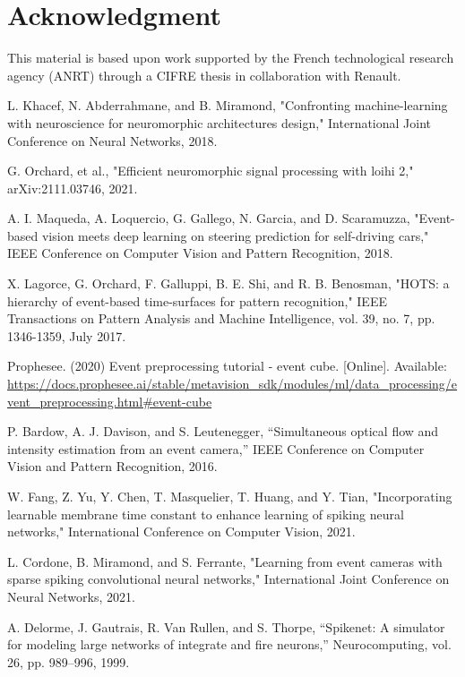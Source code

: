 \documentclass[conference]{IEEEtran}
\begin{document}
\section*{Acknowledgment}

This material is based upon work supported by the French technological research agency (ANRT) through a CIFRE thesis in collaboration with Renault.


\begin{thebibliography}{00}

 L. Khacef, N. Abderrahmane, and B. Miramond, "Confronting machine-learning with neuroscience for neuromorphic architectures design," International Joint Conference on Neural Networks, 2018.

 G. Orchard, et al., "Efficient neuromorphic signal processing with loihi 2," arXiv:2111.03746, 2021.

 A. I. Maqueda, A. Loquercio, G. Gallego, N. Garcia, and D. Scaramuzza, "Event-based vision meets deep learning on steering prediction for self-driving cars," IEEE Conference on Computer Vision and Pattern Recognition, 2018.

 X. Lagorce, G. Orchard, F. Galluppi, B. E. Shi, and R. B. Benosman, "HOTS: a hierarchy of event-based time-surfaces for pattern recognition," IEEE Transactions on Pattern Analysis and Machine Intelligence, vol. 39, no. 7, pp. 1346-1359, July 2017.

 Prophesee. (2020) Event preprocessing tutorial - event cube. [Online]. Available: \url{https://docs.prophesee.ai/stable/metavision_sdk/modules/ml/data_processing/event_preprocessing.html#event-cube}

 P. Bardow, A. J. Davison, and S. Leutenegger, “Simultaneous optical flow and intensity estimation from an event camera,” IEEE Conference on Computer Vision and Pattern Recognition, 2016.

 W. Fang, Z. Yu, Y. Chen, T. Masquelier, T. Huang, and Y. Tian, "Incorporating learnable membrane time constant to enhance learning of spiking neural networks," International Conference on Computer Vision, 2021.

 L. Cordone, B. Miramond, and S. Ferrante, "Learning from event cameras with sparse spiking convolutional neural networks," International Joint Conference on Neural Networks, 2021.

 A. Delorme, J. Gautrais, R. Van Rullen, and S. Thorpe, “Spikenet: A simulator for modeling large networks of integrate and fire neurons,” Neurocomputing, vol. 26, pp. 989–996, 1999.


\end{thebibliography}
\end{document}

